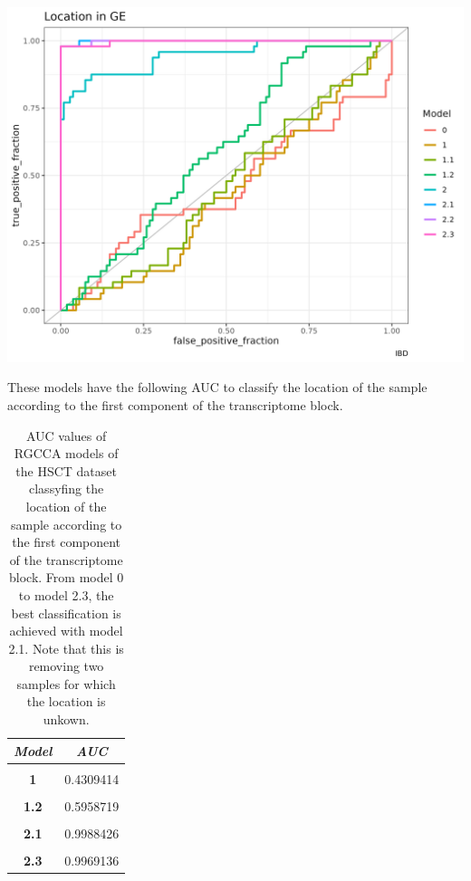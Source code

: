 \documentclass[
  12pt,
  a4paper,
  twoside,
  openright]{book}
\let\origfigure\figure
\let\endorigfigure\endfigure
\renewenvironment{figure}[1][2] {
    \expandafter\origfigure\expandafter[!htp]
} {
    \endorigfigure
}
\begin{document}
\begin{figure}
\includegraphics[width=1\linewidth]{images/hsct-auc-models} \caption[ROC curves of the RGCCA models on the HSCT dataset.]{ROC curve of the different datasets with the models from RGCCA on the HSCT dataset.}\label{fig:hsct-auc-plot}
\end{figure}

These models have the following AUC to classify the location of the sample according to the first component of the transcriptome block.

\begin{table}[H]

\caption[AUC values of RGCCA models on the HSCT dataset.]{\label{tab:hsct-auc}AUC values of RGCCA models of the HSCT dataset classyfing the location of the sample according to the first component of the transcriptome block. From model 0 to model 2.3, the best classification is achieved with model 2.1. Note that this is removing two samples for which the location is unkown.}
\centering
\begin{tabular}[t]{|>{}c|>{}c|}
\hline
\em{\textbf{Model}} & \em{\textbf{AUC}}\\
\hline
\textbf{\cellcolor{gray!6}{0}} & \cellcolor{gray!6}{0.4537037}\\
\hline
\textbf{1} & 0.4309414\\
\hline
\textbf{\cellcolor{gray!6}{1.1}} & \cellcolor{gray!6}{0.4639275}\\
\hline
\textbf{1.2} & 0.5958719\\
\hline
\textbf{\cellcolor{gray!6}{2}} & \cellcolor{gray!6}{0.9450231}\\
\hline
\textbf{2.1} & 0.9988426\\
\hline
\textbf{\cellcolor{gray!6}{2.2}} & \cellcolor{gray!6}{0.9980710}\\
\hline
\textbf{2.3} & 0.9969136\\
\hline
\end{tabular}
\end{table}
\end{document}
